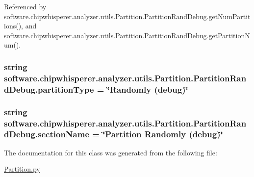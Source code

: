 Referenced by software.\+chipwhisperer.\+analyzer.\+utils.\+Partition.\+Partition\+Rand\+Debug.\+get\+Num\+Partitions(), and software.\+chipwhisperer.\+analyzer.\+utils.\+Partition.\+Partition\+Rand\+Debug.\+get\+Partition\+Num().

\hypertarget{classsoftware_1_1chipwhisperer_1_1analyzer_1_1utils_1_1Partition_1_1PartitionRandDebug_ae91088044dc7c8c6e36d1a85ea8d1e57}{}
\subsubsection[{partition\+Type}]{\setlength{\rightskip}{0pt plus 5cm}string software.\+chipwhisperer.\+analyzer.\+utils.\+Partition.\+Partition\+Rand\+Debug.\+partition\+Type = \char`\"{}Randomly (debug)\char`\"{}\hspace{0.3cm}{\ttfamily [static]}}\label{classsoftware_1_1chipwhisperer_1_1analyzer_1_1utils_1_1Partition_1_1PartitionRandDebug_ae91088044dc7c8c6e36d1a85ea8d1e57}
\hypertarget{classsoftware_1_1chipwhisperer_1_1analyzer_1_1utils_1_1Partition_1_1PartitionRandDebug_a42952d709a72af3d58d8fbed8d538748}{}
\subsubsection[{section\+Name}]{\setlength{\rightskip}{0pt plus 5cm}string software.\+chipwhisperer.\+analyzer.\+utils.\+Partition.\+Partition\+Rand\+Debug.\+section\+Name = \char`\"{}Partition Randomly (debug)\char`\"{}\hspace{0.3cm}{\ttfamily [static]}}\label{classsoftware_1_1chipwhisperer_1_1analyzer_1_1utils_1_1Partition_1_1PartitionRandDebug_a42952d709a72af3d58d8fbed8d538748}


The documentation for this class was generated from the following file\+:\begin{DoxyCompactItemize}
\item 
\hyperlink{Partition_8py}{Partition.\+py}\end{DoxyCompactItemize}
